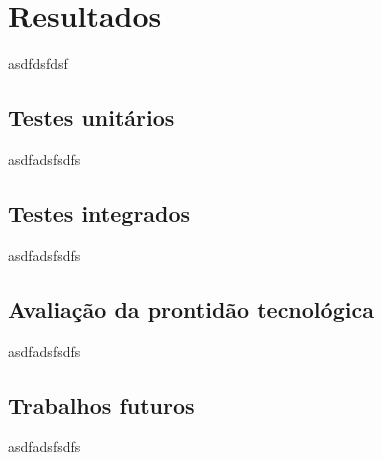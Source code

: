 \chapter{Resultados}
\label{chap:result}
asdfdsfdsf

\section{Testes unitários}
\label{sec:testu}
asdfadsfsdfs



\section{Testes integrados}
\label{sec:testi}
asdfadsfsdfs

\section{Avaliação da prontidão tecnológica}
\label{sec:trl}
asdfadsfsdfs

\section{Trabalhos futuros}
\label{sec:trabfut}
asdfadsfsdfs





